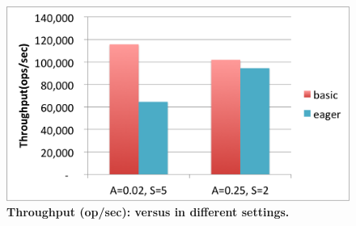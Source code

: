 \begin{figure}[htb]
\includegraphics[width=\figw]{Figs/eager-throughput.png}
\caption{\textbf{Throughput (op/sec): \eager\/ versus \basic\/ in different settings.
}}
\label{fig:eager-throughput}
\end{figure}


